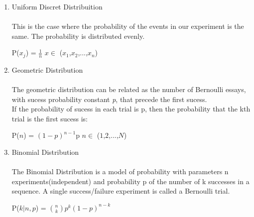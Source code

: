 \documentclass[oneside]{book}
\begin{document}
\begin{enumerate}
    \item Uniform Discret Distribuition\\\\
This is the case where the probability of the events in our experiment is the same. The probability is distributed evenly.\\
\begin{center}
{\large
    P($x_j$) = $\frac{1}{n}$\hspace{2cm} $x\in$ ({$x_1$,$x_2$,...,$x_n$})}
\end{center}
    \item Geometric Distribution\\\\
The geometric distribution can be related as the number of Bernoulli essays, with sucess probability constant \textit{p}, that precede the first sucess.\\
If the probability of sucess in each trial is p, then the probability that the kth trial is the first sucess is:
\begin{center}
{\large
    P($n$) = $(1-p)^{n-1}$p\hspace{2cm} $n\in$ ({$1$,$2$,...,$N$})}
\end{center}
  \item Binomial Distribution\\\\
  The Binomial Distribution is a model of probability with parameters n experiments(independent) and probability p of the number of k successes in a sequence. A single success/failure experiment is called a Bernoulli trial.
  \begin{center}
  {\large  P($k|n,p$) = $\binom{n}{k} p^k(1-p)^{n-k}$}
   

\end{center}
\end{enumerate}
\end{document}
